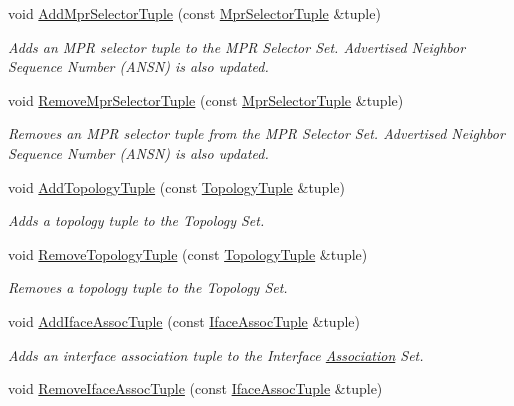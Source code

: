 \begin{DoxyCompactItemize}
void \hyperlink{classns3_1_1olsr_1_1RoutingProtocol_aff14042e35d2343b080522580f3d5b24}{Add\+Mpr\+Selector\+Tuple} (const \hyperlink{structns3_1_1olsr_1_1MprSelectorTuple}{Mpr\+Selector\+Tuple} \&tuple)
\begin{DoxyCompactList}\small\item\em Adds an M\+PR selector tuple to the M\+PR Selector Set. Advertised Neighbor Sequence Number (A\+N\+SN) is also updated. \end{DoxyCompactList}\item 
void \hyperlink{classns3_1_1olsr_1_1RoutingProtocol_ab3455ede71dab3092016964ef8577521}{Remove\+Mpr\+Selector\+Tuple} (const \hyperlink{structns3_1_1olsr_1_1MprSelectorTuple}{Mpr\+Selector\+Tuple} \&tuple)
\begin{DoxyCompactList}\small\item\em Removes an M\+PR selector tuple from the M\+PR Selector Set. Advertised Neighbor Sequence Number (A\+N\+SN) is also updated. \end{DoxyCompactList}\item 
void \hyperlink{classns3_1_1olsr_1_1RoutingProtocol_a4c151dc96f3b7208d03be261a2ada627}{Add\+Topology\+Tuple} (const \hyperlink{structns3_1_1olsr_1_1TopologyTuple}{Topology\+Tuple} \&tuple)
\begin{DoxyCompactList}\small\item\em Adds a topology tuple to the Topology Set. \end{DoxyCompactList}\item 
void \hyperlink{classns3_1_1olsr_1_1RoutingProtocol_a496a7619f3c2de003aebd7554eba2e6e}{Remove\+Topology\+Tuple} (const \hyperlink{structns3_1_1olsr_1_1TopologyTuple}{Topology\+Tuple} \&tuple)
\begin{DoxyCompactList}\small\item\em Removes a topology tuple to the Topology Set. \end{DoxyCompactList}\item 
void \hyperlink{classns3_1_1olsr_1_1RoutingProtocol_a727294984dac11244bf1e92baa141934}{Add\+Iface\+Assoc\+Tuple} (const \hyperlink{structns3_1_1olsr_1_1IfaceAssocTuple}{Iface\+Assoc\+Tuple} \&tuple)
\begin{DoxyCompactList}\small\item\em Adds an interface association tuple to the Interface \hyperlink{structns3_1_1olsr_1_1Association}{Association} Set. \end{DoxyCompactList}\item 
void \hyperlink{classns3_1_1olsr_1_1RoutingProtocol_a8ecb5343f7e51de7be585b06dbb1b721}{Remove\+Iface\+Assoc\+Tuple} (const \hyperlink{structns3_1_1olsr_1_1IfaceAssocTuple}{Iface\+Assoc\+Tuple} \&tuple)

\end{DoxyCompactItemize}

